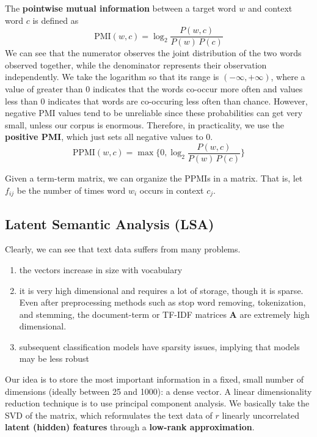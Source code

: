 \documentclass{article}
\begin{document}
    \begin{definition}[PMI]
    The \textbf{pointwise mutual information} between a target word $w$ and context word $c$ is defined as
    \[\mathrm{PMI}(w, c) = \log_2 \frac{P (w, c)}{P(w)\, P(c)}\]
    We can see that the numerator observes the joint distribution of the two words observed together, while the denominator represents their observation independently. We take the logarithm so that its range is $(-\infty, +\infty)$, where a value of greater than $0$ indicates that the words co-occur more often and values less than $0$ indicates that words are co-occuring less often than chance. However, negative PMI values tend to be unreliable since these probabilities can get very small, unless our corpus is enormous. Therefore, in practicality, we use the \textbf{positive PMI}, which just sets all negative values to $0$. 
    \[\mathrm{PPMI}(w, c) = \max \bigg\{ 0, \log_2 \frac{P (w, c)}{P(w)\, P(c)} \bigg\}\]
    \end{definition}

    Given a term-term matrix, we can organize the PPMIs in a matrix. That is, let $f_{ij}$ be the number of times word $w_i$ occurs in context $c_j$. 

  \subsection{Latent Semantic Analysis (LSA)}

    Clearly, we can see that text data suffers from many problems. 
    \begin{enumerate}
      \item the vectors increase in size with vocabulary 
      \item it is very high dimensional and requires a lot of storage, though it is sparse. Even after preprocessing methods such as stop word removing, tokenization, and stemming, the document-term or TF-IDF matrices $\mathbf{A}$ are extremely high dimensional. 
      \item subsequent classification models have sparsity issues, implying that models may be less robust
    \end{enumerate}
    Our idea is to store the most important information in a fixed, small number of dimensions (ideally between 25 and 1000): a dense vector. A linear dimensionality reduction technique is to use principal component analysis. We basically take the SVD of the matrix, which reformulates the text data of $r$ linearly uncorrelated \textbf{latent (hidden) features} through a \textbf{low-rank approximation}. 
\end{document}
